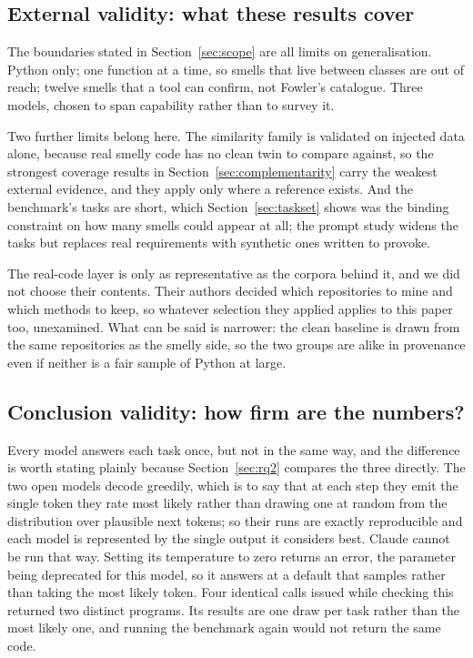 \documentclass[10pt,a4paper,twocolumn]{article}
\begin{document}
\subsection{External validity: what these results cover}

The boundaries stated in Section~\ref{sec:scope} are all limits on
generalisation. Python only; one function at a time, so smells that live between
classes are out of reach; twelve smells that a tool can confirm, not Fowler's
catalogue. Three models, chosen to span capability rather than to survey it.

Two further limits belong here. The similarity family is validated on injected
data alone, because real smelly code has no clean twin to compare against, so
the strongest coverage results in Section~\ref{sec:complementarity} carry the
weakest external evidence, and they apply only where a reference exists. And the
benchmark's tasks are short, which Section~\ref{sec:taskset} shows was the
binding constraint on how many smells could appear at all; the prompt study
widens the tasks but replaces real requirements with synthetic ones written to
provoke.

The real-code layer is only as representative as the corpora behind it, and we
did not choose their contents. Their authors decided which repositories to mine
and which methods to keep, so whatever selection they applied applies to this
paper too, unexamined. What can be said is narrower: the clean baseline is drawn
from the same repositories as the smelly side, so the two groups are alike in
provenance even if neither is a fair sample of Python at large.

\subsection{Conclusion validity: how firm are the numbers?}
\label{sec:conclusionvalidity}

Every model answers each task once, but not in the same way, and the difference
is worth stating plainly because Section~\ref{sec:rq2} compares the three
directly. The two open models decode greedily, which is to say that at each step
they emit the single token they rate most likely rather than drawing one at
random from the distribution over plausible next tokens; so their runs are
exactly reproducible and each model is represented by the single output it
considers best. Claude cannot be run that way. Setting its temperature to zero
returns an error, the parameter being deprecated for this model, so it answers
at a default that samples rather than taking the most likely token. Four
identical calls issued while checking this returned two distinct programs. Its
results are one draw per task rather than the most likely one, and running the
benchmark again would not return the same code.
\end{document}
